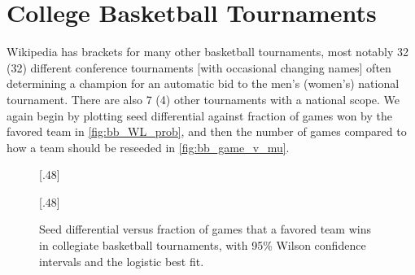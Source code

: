 \documentclass{article}
\begin{document}
\section{College Basketball Tournaments}
Wikipedia has brackets for many other basketball tournaments, most notably 32 (32) different conference tournaments [with occasional changing names] often determining a champion for an automatic bid to the men's (women's) national tournament.  There are also 7 (4) other tournaments with a national scope.  We again begin by plotting seed differential against fraction of games won by the favored team in \autoref{fig:bb_WL_prob},
and then the number of games compared to how a team should be reseeded in \autoref{fig:bb_game_v_mu}.
\begin{figure}
[.48\textwidth]{%
}\hfill
{}[.48\textwidth]{%
}
\caption{\label{fig:bb_WL_prob}Seed differential versus fraction of games that a favored team wins in collegiate basketball tournaments, with 95\% Wilson confidence intervals and the logistic best fit.}
\end{figure}
\end{document}
